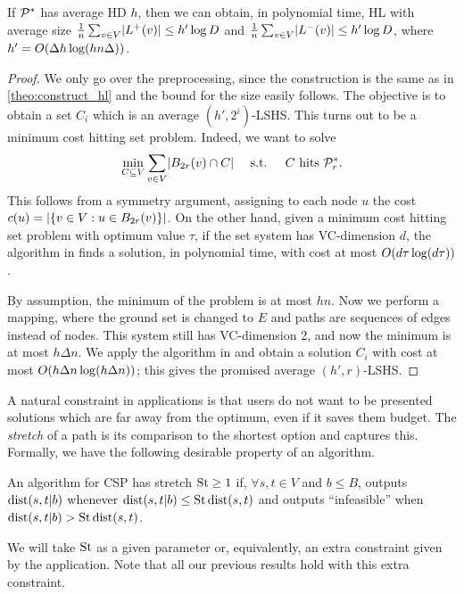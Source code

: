 \begin{theorem}\label{theo:preproc_avg}
If $\mathcal{P}^*$ has average HD $h$, then we can obtain, in polynomial time, HL with average size 
$\frac{1}{n}\sum_{v\in V} \lvert L^+(v)\rvert \leq h'\log D$ and 
$\frac{1}{n}\sum_{v\in V} \lvert L^-(v)\rvert \leq h'\log D$,
where $h'=O(\Delta h\log (hn\Delta))$.
\end{theorem}
\begin{proof}
We only go over the preprocessing, since the construction is the same as in \cref{theo:construct_hl} and the bound for the size easily follows. 
The objective is to obtain a set $C_i$ which is an average $(h',2^i)$-LSHS.
This turns out to be a minimum cost hitting set problem.
Indeed, we want to solve
\[
\min_{C\subseteq V} \sum_{v\in V}\lvert B_{2r}(v)\cap C\rvert  \quad \text{ s.t. } \quad C \text{ hits } \mathcal{P}^*_r.
\]
This follows from a symmetry argument, assigning to each node $u$ the cost $c(u)=\lvert\{v\in V: u\in B_{2r}(v)\}\rvert$.
On the other hand, given a minimum cost hitting set problem with optimum value $\tau$, if the set system has VC-dimension $d$, the algorithm in \cite{vc_dim_hitting} finds a solution, in polynomial time, with cost at most $O(d\tau\log(d\tau))$.

By assumption, the minimum of the problem is at most $hn$.
Now we perform a mapping, where the ground set is changed to $E$ and paths are sequences of edges instead of nodes.
This system still has VC-dimension 2, and now the minimum is at most $h\Delta n$.
We apply the algorithm in \cite{vc_dim_hitting} and obtain a solution $C_i$ with cost at most $O(h\Delta n\log(h\Delta n))$; this gives the promised average $(h',r)$-LSHS.
\end{proof}

A natural constraint in applications is that users do not want to be presented solutions which are far away from the optimum, even if it saves them budget.
The \emph{stretch} of a path is its comparison to the shortest option and captures this.
Formally, we have the following desirable property of an algorithm.

\begin{definition}[Stretch]
An algorithm for CSP has stretch $\operatorname{St}\geq 1$ if, $\forall s,t\in V$ and $b\leq B$, outputs $\mbox{dist}(s,t|b)$ whenever $\mbox{dist}(s,t|b)\leq \operatorname{St}\mbox{dist}(s,t)$ and outputs ``infeasible'' when $\mbox{dist}(s,t|b)>\operatorname{St}\mbox{dist}(s,t)$.
\end{definition}
We will take $\operatorname{St}$ as a given parameter or, equivalently, an extra constraint given by the application. 
Note that all our previous results hold with this extra constraint.